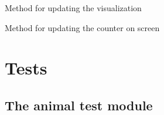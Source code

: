 \documentclass[a4paper,10pt,english]{sphinxmanual}
\begin{document}
\begin{fulllineitems}
\begin{fulllineitems}
\end{fulllineitems}


\begin{fulllineitems}
\label{\detokenize{simulation:biosim.simulation.BioSim.update_visualization}}
Method for updating the visualization

\end{fulllineitems}


\begin{fulllineitems}
\label{\detokenize{simulation:biosim.simulation.BioSim.year_counter}}
Method for updating the counter on screen

\end{fulllineitems}


\end{fulllineitems}



\chapter{Tests}
\label{\detokenize{tests:tests}}\label{\detokenize{tests::doc}}

\section{The animal test module}
\label{\detokenize{tests:the-animal-test-module}}\label{\detokenize{tests:module-biosim.tests.test_animals}}
\end{document}
